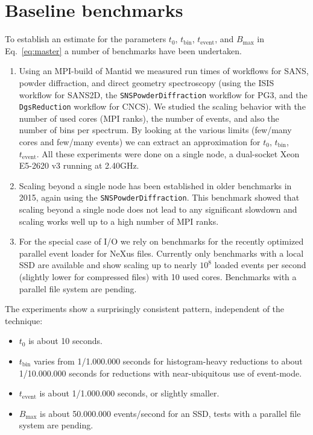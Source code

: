 \documentclass[a4paper,english,numbers=noenddot,bibliography=totoc,chapterprefix=on,DIV=12]{scrartcl}
\newcommand{\Tbin}{t_{\text{bin}}}
\newcommand{\Tevent}{t_{\text{event}}}
\newcommand{\Bmax}{B_{\text{max}}}
\newcommand{\nexus}{NeXus\xspace}
\begin{document}
\section{Baseline benchmarks}
\label{sec:benchmarks}

To establish an estimate for the parameters $t_0$, $\Tbin$, $\Tevent$, and $\Bmax$ in Eq.~\eqref{eq:master} a number of benchmarks have been undertaken.

\begin{enumerate}
  \item Using an MPI-build of Mantid we measured run times of workflows for SANS, powder diffraction, and direct geometry spectroscopy (using the ISIS workflow for SANS2D, the \verb|SNSPowderDiffraction| workflow for PG3, and the \verb|DgsReduction| workflow for CNCS).
    We studied the scaling behavior with the number of used cores (MPI ranks), the number of events, and also the number of bins per spectrum.
    By looking at the various limits (few/many cores and few/many events) we can extract an approximation for $t_0$, $\Tbin$, $\Tevent$.
    All these experiments were done on a single node, a dual-socket Xeon E5-2620 v3 running at 2.40GHz.
  \item Scaling beyond a single node has been established in older benchmarks in 2015, again using the \verb|SNSPowderDiffraction|.
    This benchmark showed that scaling beyond a single node does not lead to any significant slowdown and scaling works well up to a high number of MPI ranks.
  \item For the special case of I/O we rely on benchmarks for the recently optimized parallel event loader for \nexus files.
    Currently only benchmarks with a local SSD are available and show scaling up to nearly $10^8$ loaded events per second (slightly lower for compressed files) with 10 used cores.
    Benchmarks with a parallel file system are pending.
\end{enumerate}
The experiments show a surprisingly consistent pattern, independent of the technique:

\begin{itemize}
\item $t_0$ is about 10 seconds.
\item $\Tbin$ varies from 1/1.000.000 seconds for histogram-heavy reductions to about 1/10.000.000 seconds for reductions with near-ubiquitous use of event-mode.
\item $\Tevent$ is about 1/1.000.000 seconds, or slightly smaller.
\item $\Bmax$ is about 50.000.000 events/second for an SSD, tests with a parallel file system are pending.
\end{itemize}
\end{document}
